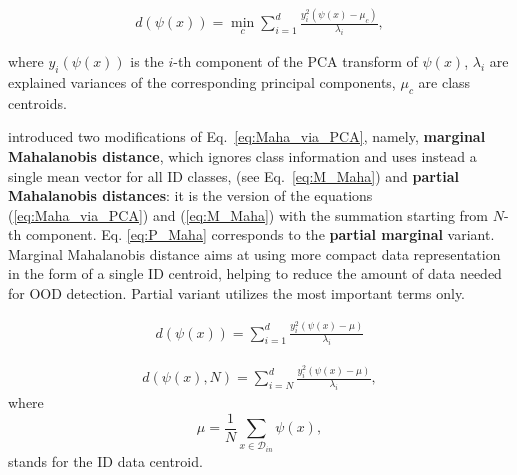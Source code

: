 \documentclass[letterpaper, final]{article} %
\begin{document}
\begin{equation}
\begin{gathered}
d(\psi(x))=\min\limits_{c}\sum\limits_{i=1}^{d}\frac{y_i^2(\psi(x) - \mu_c)}{\lambda_i},
\end{gathered}
\label{eq:Maha_via_PCA}
\end{equation}

where $y_i(\psi(x))$ is the $i$-th component of the PCA transform of $\psi(x)$, $\lambda_i$ are explained variances of the corresponding principal components, $\mu_c$ are class centroids.

\citet*{Kamoi2020WhyIT} introduced two modifications of Eq.~\ref{eq:Maha_via_PCA}, namely, {\bf marginal Mahalanobis distance}, which  ignores class information and uses instead a single mean vector for all ID classes, (see Eq.~\ref{eq:M_Maha}) and {\bf partial Mahalanobis distances}: it is the version of the equations (\ref{eq:Maha_via_PCA}) and (\ref{eq:M_Maha}) with the summation starting from $N$-th component. Eq. \ref{eq:P_Maha} corresponds to the {\bf partial marginal} variant. Marginal Mahalanobis distance aims at using more compact data representation in the form of a single ID centroid, helping to reduce the amount of data needed for OOD detection. Partial variant utilizes  the most important terms only.

\begin{equation}
\begin{gathered}
        d(\psi(x))=\sum\limits_{i=1}^{d}\frac{y_i^2(\psi(x)-\mu)}{\lambda_i}
\end{gathered}
\label{eq:M_Maha}
\end{equation}

\begin{equation}
\begin{gathered}
        d(\psi(x), N) = \sum\limits_{i=N}^{d} \frac{y_i^2(\psi(x)-\mu)}{\lambda_i}, 
\end{gathered}
\label{eq:P_Maha}
\end{equation}
where
$$
\mu  = \frac{1}{N}\sum\limits_{x\in\mathcal{D}_{in}} \psi(x), 
$$
stands for the ID data centroid.
\end{document}
